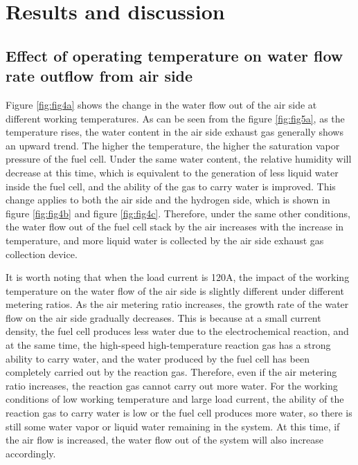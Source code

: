 \section{Results and discussion}
\subsection{Effect of operating temperature on water flow rate outflow from air side}

Figure \ref{fig:fig4a} shows the change in the water flow out of the air side at different working temperatures. As can be seen from the figure \ref{fig:fig5a}, as the temperature rises, the water content in the air side exhaust gas generally shows an upward trend. The higher the temperature, the higher the saturation vapor pressure of the fuel cell. Under the same water content, the relative humidity will decrease at this time, which is equivalent to the generation of less liquid water inside the fuel cell, and the ability of the gas to carry water is improved. This change applies to both the air side and the hydrogen side, which is shown in figure \ref{fig:fig4b} and figure \ref{fig:fig4c}. Therefore, under the same other conditions, the water flow out of the fuel cell stack by the air increases with the increase in temperature, and more liquid water is collected by the air side exhaust gas collection device.
\par
It is worth noting that when the load current is 120A, the impact of the working temperature on the water flow of the air side is slightly different under different metering ratios. As the air metering ratio increases, the growth rate of the water flow on the air side gradually decreases. This is because at a small current density, the fuel cell produces less water due to the electrochemical reaction, and at the same time, the high-speed high-temperature reaction gas has a strong ability to carry water, and the water produced by the fuel cell has been completely carried out by the reaction gas. Therefore, even if the air metering ratio increases, the reaction gas cannot carry out more water. For the working conditions of low working temperature and large load current, the ability of the reaction gas to carry water is low or the fuel cell produces more water, so there is still some water vapor or liquid water remaining in the system. At this time, if the air flow is increased, the water flow out of the system will also increase accordingly.

